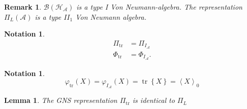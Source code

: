 \documentclass[aps,preprint]{revtex4}%
\newtheorem{lemma}[theorem]{Lemma}
\newtheorem{notation}[theorem]{Notation}
\newtheorem{remark}[theorem]{Remark}
\begin{document}
\begin{remark}
$\mathcal{B}\left(  \mathcal{H}_{\mathcal{A}}\right)  $ is a type I Von
Neumann\emph{-algebra}. The representation $\Pi_{L}\left(  \mathcal{A}\right)
$ is a type $II_{1}$ Von Neumann algebra.
\end{remark}

\begin{notation}%
\begin{align}
\Pi_{\operatorname*{tr}}  &  =\Pi_{I_{\mathcal{A}}}\\
\Phi_{\operatorname*{tr}}  &  =\Phi_{I_{\mathcal{A}}}.
\end{align}

\end{notation}

\begin{notation}%
\begin{equation}
\varphi_{\operatorname*{tr}}\left(  X\right)  =\varphi_{I_{\mathcal{A}}%
}\left(  X\right)  =\operatorname*{tr}\left\{  X\right\}  =\left\langle
X\right\rangle _{0}%
\end{equation}

\end{notation}

\begin{lemma}
The GNS representation $\Pi_{\operatorname*{tr}}$ is identical to $\Pi_{L}$
\end{lemma}
\end{document}
